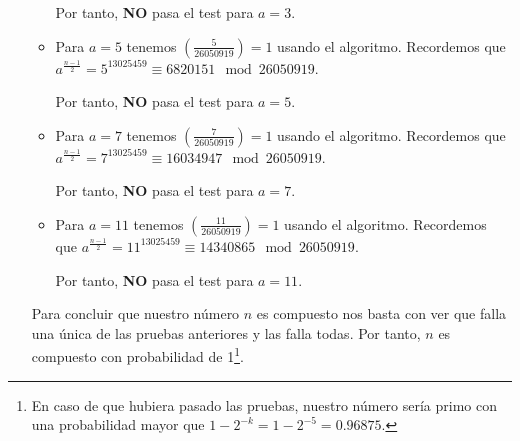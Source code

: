 \begin{enumerate}
\begin{itemize}
			Por tanto, \textbf{NO} pasa el test para $a = 3$.
				
			\item Para $a = 5$ tenemos $\displaystyle \left(\frac{5}{26050919} \right) = 1$ usando el algoritmo.
			Recordemos que $ a^{\frac{n-1}{2}} = 5^{13025459} \equiv 6820151 \mod 26050919$.

			Por tanto, \textbf{NO} pasa el test para $a = 5$.
				
			\item Para $a = 7$ tenemos $\displaystyle \left(\frac{7}{26050919} \right) = 1$ usando el algoritmo.
			Recordemos que $ a^{\frac{n-1}{2}} = 7^{13025459} \equiv 16034947 \mod 26050919$.

			Por tanto, \textbf{NO} pasa el test para $a = 7$.
											
			\item Para $a = 11$ tenemos $\displaystyle \left(\frac{11}{26050919} \right) = 1$ usando el algoritmo.
			Recordemos que $ a^{\frac{n-1}{2}} = 11^{13025459} \equiv 14340865 \mod 26050919$.

			Por tanto, \textbf{NO} pasa el test para $a = 11$.		
		\end{itemize}
	
		Para concluir que nuestro número $n$ es compuesto nos basta con ver que falla una única de las pruebas
		anteriores y las falla todas. Por tanto, $n$ es compuesto con probabilidad de 1\footnote{En caso de que
		hubiera pasado las pruebas, nuestro número sería primo con una probabilidad mayor que $1-2^{-k} =
		1-2^{-5} = 0.96875$.}.
	
	\end{enumerate}